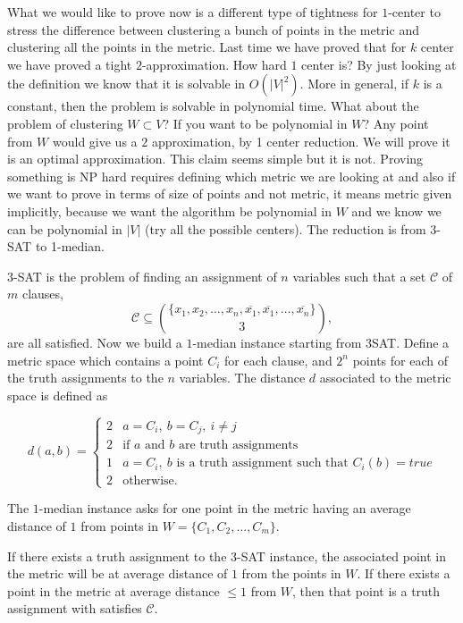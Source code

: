 What we would like to prove now is a different type of tightness for $1$-center to stress the difference between clustering a bunch of points in the metric and clustering all the points in the metric. Last time we have proved that for $k$ center we have proved a tight $2$-approximation. How hard $1$ center is? By just looking at the definition we know that it is solvable in $O(|V|^2)$. More in general, if $k$ is a constant, then the problem is solvable in polynomial time. What about the problem of clustering $W\subset V$? If you want to be polynomial in $W$? Any point from $W$ would give us a $2$ approximation, by 1 center reduction. We will prove it is an optimal approximation. This claim seems simple but it is not. Proving something  is NP hard requires defining which metric we are looking at and also if we want to prove in terms of size of points and not metric, it means metric given implicitly, because we want the algorithm be polynomial in $W$ and we know we can be polynomial in $|V|$ (try all the possible centers). The reduction is from 3-SAT to 1-median.
 
 3-SAT is the problem of finding an assignment of $n$ variables such that a set $\mathcal{C}$  of $m$ clauses,
 \begin{equation}
 \mathcal{C} \subseteq \binom{\{x_1, x_2, \ldots, x_n,\overline{x_1},\overline{x_1},\ldots, \overline{x_n}\}}{3},
 \end{equation}
  are all satisfied. Now we build a $1$-median instance starting from 3SAT. Define a metric space which contains a point $C_i$ for each clause, and $2^n$ points for each of the truth assignments to the $n$ variables. The distance $d$ associated to the metric space is defined as
  
  \begin{equation}
  d(a, b) = \begin{cases}
  		2 & a = C_i,\ b = C_j,\ i \neq j\\
  		2 & \text{if $a$ and $b$ are truth assignments}\\
		1 & a = C_i,\ \text{$b$ is a truth assignment such that $C_i(b) = true$}\\
		2 & \text{otherwise} .
  \end{cases} 
  \end{equation}
  
  The $1$-median instance asks for one point in the metric having an average distance of $1$ from points in $ W = \{C_1, C_2, \ldots, C_m\}$.
  
  If there exists a truth assignment to the 3-SAT instance, the associated point in the metric will be at average distance of $1$ from the points in $W$. If there exists a point in the metric at average distance $\leq 1$ from $W$, then that point is a truth assignment with satisfies $\mathcal{C}$.

